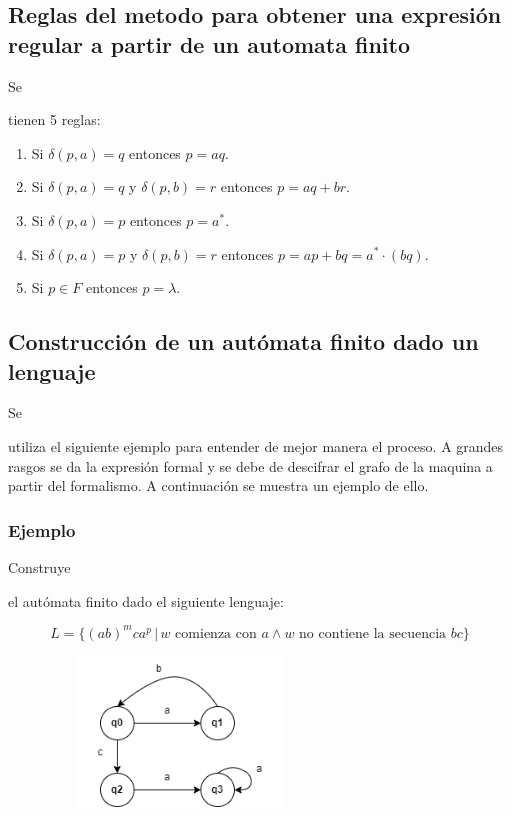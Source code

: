 \documentclass[stu, 12pt, letterpaper, donotrepeattitle, floatsintext, natbib]{apa7}
\begin{document}
\subsection{Reglas del metodo para obtener una expresión regular a partir de un automata finito}
Se \begin{justifying}
    tienen 5 reglas:
    \begin{enumerate}
        \item Si \(\delta(p, a)=q\) entonces \(p=aq\).
        \item Si \(\delta(p, a)=q\) y \(\delta(p, b)=r\) entonces \(p=aq+br\).
        \item Si \(\delta(p, a)=p\) entonces \(p=a^*\).
        \item Si \(\delta(p, a)=p\) y \(\delta(p, b)=r\) entonces \(p=ap+bq=a^*\cdot (bq)\).
        \item Si \(p\in F\) entonces \(p=\lambda\).
    \end{enumerate}\par
\end{justifying}
\vspace{\baselineskip}
\subsection{Construcción de un autómata finito dado un lenguaje}
Se \begin{justifying}
    utiliza el siguiente ejemplo para entender de mejor manera el proceso. A grandes rasgos se da la expresión formal
y se debe de descifrar el grafo de la maquina a partir del formalismo. A continuación se muestra un ejemplo de ello.\par
\end{justifying}
\subsubsection{Ejemplo}
Construye \begin{justifying}
    el autómata finito dado el siguiente lenguaje:\par
\end{justifying}
\[L=\{(ab)^mca^p\,|\,w \text{ comienza con }a\land w \text{ no contiene la secuencia }bc\}\]
\begin{figure}[H]
    \centering
    \includegraphics[width=7cm, height=4cm]{ejemplo_construct.png}
\end{figure}
\vspace{\baselineskip}
\end{document}

